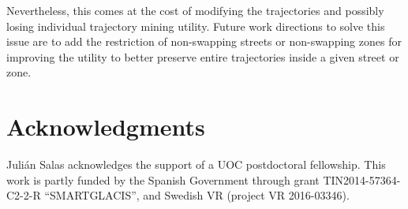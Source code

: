 \documentclass{llncs}
\begin{document}
Nevertheless, this comes at the cost of modifying the trajectories and possibly losing individual trajectory mining utility.
Future work directions to solve this issue are to add the restriction of non-swapping streets or non-swapping zones for improving the utility to better preserve entire trajectories inside a given street or zone.

\section*{Acknowledgments}
Juli\'{a}n Salas acknowledges the support of a UOC postdoctoral fellowship.
This work is partly funded by the Spanish Government through grant TIN2014-57364-C2-2-R ``SMARTGLACIS'', and Swedish VR (project VR 2016-03346).



\end{document}
